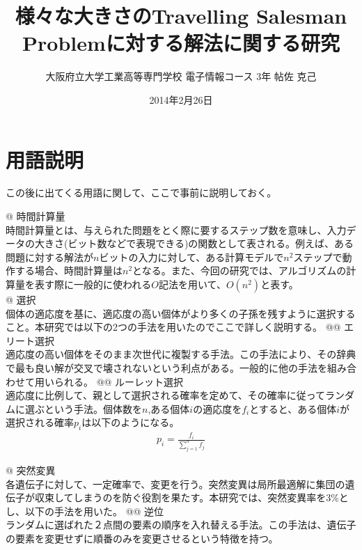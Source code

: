 \documentclass[a4paper, 11pt]{jsarticle}
\title{様々な大きさのTravelling Salesman Problemに対する解法に関する研究}
\author{大阪府立大学工業高等専門学校 電子情報コース 3年 帖佐 克己}
\date{2014年2月26日}
\begin{document}
\maketitle
\thispagestyle{empty}
\pagebreak
\tableofcontents
\pagebreak

\section{用語説明}

この後に出てくる用語に関して、ここで事前に説明しておく。 \\

\begin{easylist}[itemize]

		@ 時間計算量 \\
			時間計算量とは、与えられた問題をとく際に要するステップ数を意味し、入力データの大きさ(ビット数などで表現できる)の関数として表される。例えば、ある問題に対する解法が$n$ビットの入力に対して、ある計算モデルで$n^2$ステップで動作する場合、時間計算量は$n^2$となる。また、今回の研究では、アルゴリズムの計算量を表す際に一般的に使われる$O$記法を用いて、$O(n^2)$と表す。 \\

		@ 選択 \\
			個体の適応度を基に、適応度の高い個体がより多くの子孫を残すように選択すること。本研究では以下の2つの手法を用いたのでここで詳しく説明する。
			@@ エリート選択 \\
				適応度の高い個体をそのまま次世代に複製する手法。この手法により、その辞典で最も良い解が交叉で壊されないという利点がある。一般的に他の手法を組み合わせて用いられる。
			@@ ルーレット選択 \\
				適応度に比例して、親として選択される確率を定めて、その確率に従ってランダムに選ぶという手法。個体数を$n$,ある個体$i$の適応度を$f_i$とすると、ある個体$i$が選択される確率$p_i$は以下のようになる。
				\begin{eqnarray*}
					p_i = \frac{f_i}{\displaystyle \sum_{j=1}^{n}f_j}
				\end{eqnarray*}

		@ 突然変異 \\
			各遺伝子に対して、一定確率で、変更を行う。突然変異は局所最適解に集団の遺伝子が収束してしまうのを防ぐ役割を果たす。本研究では、突然変異率を3\%とし、以下の手法を用いた。
			@@ 逆位 \\
				ランダムに選ばれた２点間の要素の順序を入れ替える手法。この手法は、遺伝子の要素を変更せずに順番のみを変更させるという特徴を持つ。 \\
\pagebreak


\end{easylist}
\end{document}
